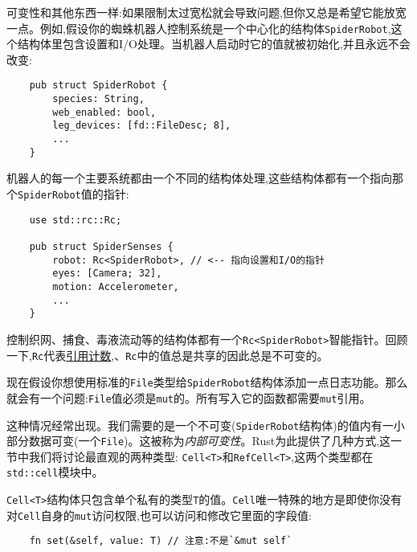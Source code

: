 可变性和其他东西一样:如果限制太过宽松就会导致问题,但你又总是希望它能放宽一点。例如,假设你的蜘蛛机器人控制系统是一个中心化的结构体\texttt{SpiderRobot},这个结构体里包含设置和I/O处理。当机器人启动时它的值就被初始化,并且永远不会改变:
\begin{verbatim}
    pub struct SpiderRobot {
        species: String,
        web_enabled: bool,
        leg_devices: [fd::FileDesc; 8],
        ...
    }
\end{verbatim}

机器人的每一个主要系统都由一个不同的结构体处理,这些结构体都有一个指向那个\texttt{SpiderRobot}值的指针:
\begin{verbatim}
    use std::rc::Rc;

    pub struct SpiderSenses {
        robot: Rc<SpiderRobot>, // <-- 指向设置和I/O的指针
        eyes: [Camera; 32],
        motion: Accelerometer,
        ...
    }
\end{verbatim}

控制织网、捕食、毒液流动等的结构体都有一个\texttt{Rc<SpiderRobot>}智能指针。回顾一下,\texttt{Rc}代表\hyperref[rc]{引用计数},、\texttt{Rc}中的值总是共享的因此总是不可变的。

现在假设你想使用标准的\texttt{File}类型给\texttt{SpiderRobot}结构体添加一点日志功能。那么就会有一个问题:\texttt{File}值必须是\texttt{mut}的。所有写入它的函数都需要\texttt{mut}引用。

这种情况经常出现。我们需要的是一个不可变(\texttt{SpiderRobot}结构体)的值内有一小部分数据可变(一个\texttt{File})。这被称为\emph{内部可变性}。Rust为此提供了几种方式,这一节中我们将讨论最直观的两种类型:
\texttt{Cell<T>}和\texttt{RefCell<T>},这两个类型都在\texttt{std::cell}模块中。

\texttt{Cell<T>}结构体只包含单个私有的类型\texttt{T}的值。\texttt{Cell}唯一特殊的地方是即使你没有对\texttt{Cell}自身的\texttt{mut}访问权限,也可以访问和修改它里面的字段值:



\begin{verbatim}
    fn set(&self, value: T) // 注意:不是`&mut self`
\end{verbatim}

